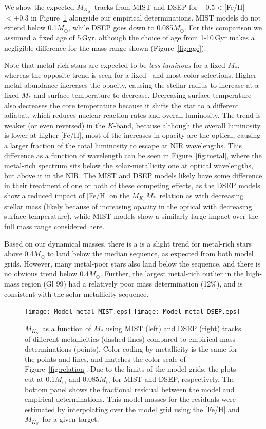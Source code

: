 \documentclass[twocolumn]{aastex62}
\newcommand{\mks}{$M_{K_S}$}
\newcommand{\mmk}{$M_{K_S}$\textendash$M_*$}
\begin{document}
We show the expected \mks\ tracks from MIST and DSEP for $-0.5<$[Fe/H]$<+0.3$ in Figure~\ref{fig:mk_metal} alongside our empirical determinations. MIST models do not extend below 0.1$M_\odot$, while DSEP goes down to 0.085$M_\odot$. For this comparison we assumed a fixed age of 5\,Gyr, although the choice of age from 1-10\,Gyr makes a negligible difference for the mass range shown (Figure~\ref{fig:age}). 

Note that metal-rich stars are expected to be {\it less luminous} for a fixed $M_*$, whereas the opposite trend is seen for a fixed \teff\ and most color selections. Higher metal abundance increases the opacity, causing the stellar radius to increase at a fixed $M_*$ and surface temperature to decrease. Decreasing surface temperature also decreases the core temperature because it shifts the star to a different adiabat, which reduces nuclear reaction rates and overall luminosity. The trend is weaker (or even reversed) in the $K$-band, because although the overall luminosity is lower at higher [Fe/H], most of the increases in opacity are the optical, causing a larger fraction of the total luminosity to escape at NIR wavelengths. This difference as a function of wavelength can be seen in Figure~\ref{fig:metal}, where the metal-rich spectrum sits below the solar-metallicity one at optical wavelengths, but above it in the NIR. The MIST and DSEP models likely have some difference in their treatment of one or both of these competing effects, as the DSEP models show a reduced impact of [Fe/H] on the \mmk\ relation as with decreasing stellar mass (likely because of increasing opacity in the optical with decreasing surface temperature), while MIST models show a similarly large impact over the full mass range considered here. 

Based on our dynamical masses, there is a is a slight trend for metal-rich stars above 0.4$M_\odot$ to land below the median sequence, as expected from both model grids. However, many metal-poor stars also land below the sequence, and there is no obvious trend below 0.4$M_\odot$. Further, the largest metal-rich outlier in the high-mass region (Gl 99) had a relatively poor mass determination (12\%), and is consistent with the solar-metallicity sequence. 

\begin{figure}[htp]
\begin{center}
\texttt{[image: Model\_metal\_MIST.eps]}
\texttt{[image: Model\_metal\_DSEP.eps]}
\caption{\mks\ as a function of $M_*$ using MIST (left) and DSEP (right) tracks of different metallicities (dashed lines) compared to empirical mass determinations (points). Color-coding by metallicity is the same for the points and lines, and matches the color scale of Figure~\ref{fig:relation}. Due to the limits of the model grids, the plots cut at 0.1$M_\odot$ and 0.085$M_\odot$ for MIST and DSEP, respectively. The bottom panel shows the fractional residual between the model and empirical determinations. This model masses for the residuals were estimated by interpolating over the model grid using the [Fe/H] and \mks\ for a given target. }
\label{fig:mk_metal}
\end{center}
\end{figure}
\end{document}
